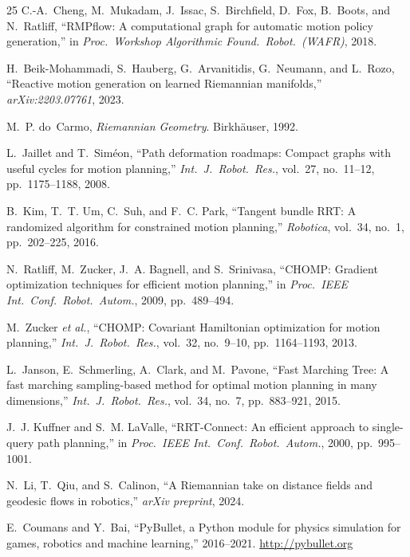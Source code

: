 \documentclass[journal]{IEEEtran}
\begin{document}
\begin{thebibliography}{25}
C.-A.~Cheng, M.~Mukadam, J.~Issac, S.~Birchfield, D.~Fox, B.~Boots,
and N.~Ratliff,
``RMPflow: A computational graph for automatic motion policy
generation,''
in \emph{Proc.\ Workshop Algorithmic Found.\ Robot.\ (WAFR)}, 2018.

H.~Beik-Mohammadi, S.~Hauberg, G.~Arvanitidis, G.~Neumann, and
L.~Rozo,
``Reactive motion generation on learned Riemannian manifolds,''
\emph{arXiv:2203.07761}, 2023.

M.~P. do~Carmo, \emph{Riemannian Geometry}.
Birkh\"{a}user, 1992.

L.~Jaillet and T.~Sim\'{e}on,
``Path deformation roadmaps: Compact graphs with useful cycles for
motion planning,''
\emph{Int.\ J.\ Robot.\ Res.}, vol.~27, no.~11--12, pp.~1175--1188, 2008.

B.~Kim, T.~T. Um, C.~Suh, and F.~C. Park,
``Tangent bundle RRT: A randomized algorithm for constrained motion
planning,''
\emph{Robotica}, vol.~34, no.~1, pp.~202--225, 2016.

N.~Ratliff, M.~Zucker, J.~A. Bagnell, and S.~Srinivasa,
``CHOMP: Gradient optimization techniques for efficient motion
planning,''
in \emph{Proc.\ IEEE Int.\ Conf.\ Robot.\ Autom.}, 2009,
pp.~489--494.

M.~Zucker \emph{et al.},
``CHOMP: Covariant Hamiltonian optimization for motion planning,''
\emph{Int.\ J.\ Robot.\ Res.}, vol.~32, no.~9--10, pp.~1164--1193, 2013.

L.~Janson, E.~Schmerling, A.~Clark, and M.~Pavone,
``Fast Marching Tree: A fast marching sampling-based method for
optimal motion planning in many dimensions,''
\emph{Int.\ J.\ Robot.\ Res.}, vol.~34, no.~7, pp.~883--921, 2015.

J.~J. Kuffner and S.~M. LaValle,
``RRT-Connect: An efficient approach to single-query path planning,''
in \emph{Proc.\ IEEE Int.\ Conf.\ Robot.\ Autom.}, 2000,
pp.~995--1001.

N.~Li, T.~Qiu, and S.~Calinon,
``A Riemannian take on distance fields and geodesic flows in
robotics,''
\emph{arXiv preprint}, 2024.

E.~Coumans and Y.~Bai,
``PyBullet, a Python module for physics simulation for games,
robotics and machine learning,'' 2016--2021.
\url{http://pybullet.org}

\end{thebibliography}
\end{document}
